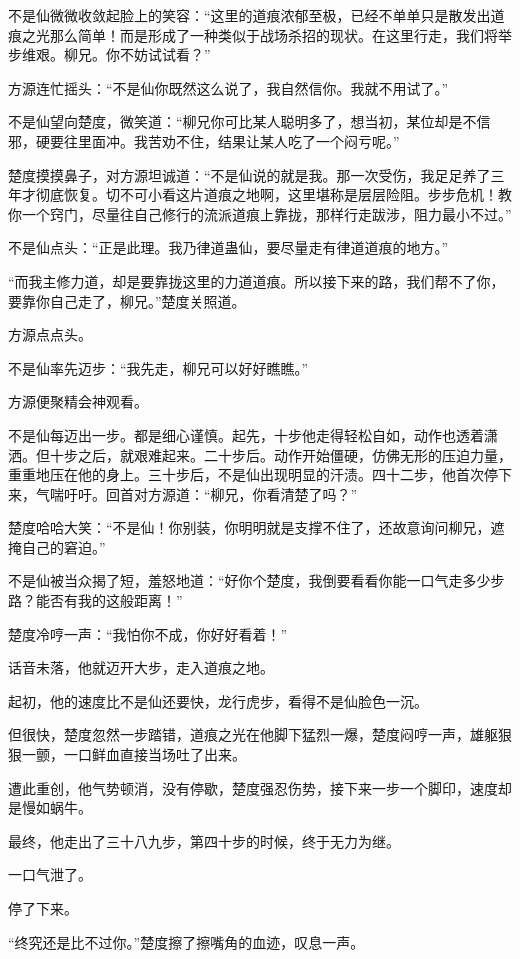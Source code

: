 \begin{this_body}
不是仙微微收敛起脸上的笑容：“这里的道痕浓郁至极，已经不单单只是散发出道痕之光那么简单！而是形成了一种类似于战场杀招的现状。在这里行走，我们将举步维艰。柳兄。你不妨试试看？”

方源连忙摇头：“不是仙你既然这么说了，我自然信你。我就不用试了。”

不是仙望向楚度，微笑道：“柳兄你可比某人聪明多了，想当初，某位却是不信邪，硬要往里面冲。我苦劝不住，结果让某人吃了一个闷亏呢。”

楚度摸摸鼻子，对方源坦诚道：“不是仙说的就是我。那一次受伤，我足足养了三年才彻底恢复。切不可小看这片道痕之地啊，这里堪称是层层险阻。步步危机！教你一个窍门，尽量往自己修行的流派道痕上靠拢，那样行走跋涉，阻力最小不过。”

不是仙点头：“正是此理。我乃律道蛊仙，要尽量走有律道道痕的地方。”

“而我主修力道，却是要靠拢这里的力道道痕。所以接下来的路，我们帮不了你，要靠你自己走了，柳兄。”楚度关照道。

方源点点头。

不是仙率先迈步：“我先走，柳兄可以好好瞧瞧。”

方源便聚精会神观看。

不是仙每迈出一步。都是细心谨慎。起先，十步他走得轻松自如，动作也透着潇洒。但十步之后，就艰难起来。二十步后。动作开始僵硬，仿佛无形的压迫力量，重重地压在他的身上。三十步后，不是仙出现明显的汗渍。四十二步，他首次停下来，气喘吁吁。回首对方源道：“柳兄，你看清楚了吗？”

楚度哈哈大笑：“不是仙！你别装，你明明就是支撑不住了，还故意询问柳兄，遮掩自己的窘迫。”

不是仙被当众揭了短，羞怒地道：“好你个楚度，我倒要看看你能一口气走多少步路？能否有我的这般距离！”

楚度冷哼一声：“我怕你不成，你好好看着！”

话音未落，他就迈开大步，走入道痕之地。

起初，他的速度比不是仙还要快，龙行虎步，看得不是仙脸色一沉。

但很快，楚度忽然一步踏错，道痕之光在他脚下猛烈一爆，楚度闷哼一声，雄躯狠狠一颤，一口鲜血直接当场吐了出来。

遭此重创，他气势顿消，没有停歇，楚度强忍伤势，接下来一步一个脚印，速度却是慢如蜗牛。

最终，他走出了三十八九步，第四十步的时候，终于无力为继。

一口气泄了。

停了下来。

“终究还是比不过你。”楚度擦了擦嘴角的血迹，叹息一声。


\end{this_body}

